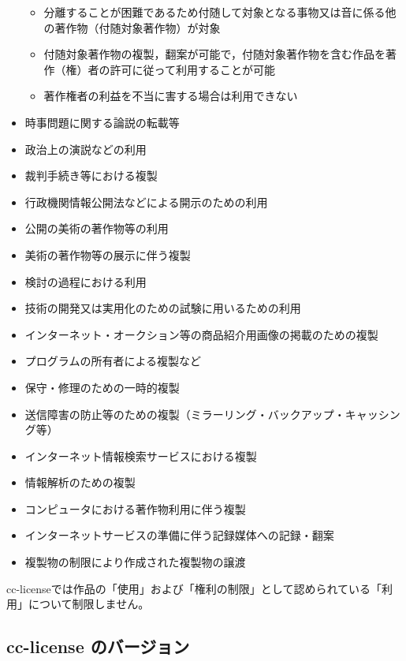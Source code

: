 \documentclass{ltjsarticle}
\begin{document}
\begin{itemize}
\begin{itemize}
      \item 分離することが困難であるため付随して対象となる事物又は音に係る他の著作物（付随対象著作物）が対象
      \item 付随対象著作物の複製，翻案が可能で，付随対象著作物を含む作品を著作（権）者の許可に従って利用することが可能
      \item 著作権者の利益を不当に害する場合は利用できない
      \end{itemize}
\item 時事問題に関する論説の転載等
\item 政治上の演説などの利用
\item 裁判手続き等における複製
\item 行政機関情報公開法などによる開示のための利用
\item 公開の美術の著作物等の利用
\item 美術の著作物等の展示に伴う複製
\item 検討の過程における利用
\item 技術の開発又は実用化のための試験に用いるための利用
\item インターネット・オークション等の商品紹介用画像の掲載のための複製
\item プログラムの所有者による複製など
\item 保守・修理のための一時的複製
\item 送信障害の防止等のための複製（ミラーリング・バックアップ・キャッシング等）
\item インターネット情報検索サービスにおける複製
\item 情報解析のための複製
\item コンピュータにおける著作物利用に伴う複製
\item インターネットサービスの準備に伴う記録媒体への記録・翻案
\item 複製物の制限により作成された複製物の譲渡
\end{itemize}

cc-licenseでは作品の「使用」および「権利の制限」として認められている「利用」について制限しません。


\subsection{cc-license のバージョン}
\end{document}
